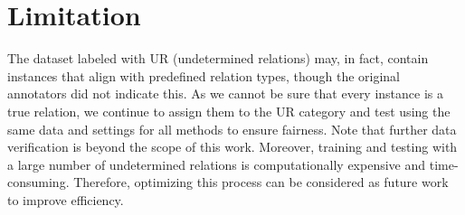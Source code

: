 \section{Limitation}
The dataset labeled with UR (undetermined relations) may, in fact, contain instances that align with predefined relation types, though the original annotators did not indicate this. As we cannot be sure that every instance is a true relation, we continue to assign them to the UR category and test using the same data and settings for all methods to ensure fairness. Note that further data verification is beyond the scope of this work. Moreover, training and testing with a large number of undetermined relations is computationally expensive and time-consuming. Therefore, optimizing this process can be considered as future work to improve efficiency.